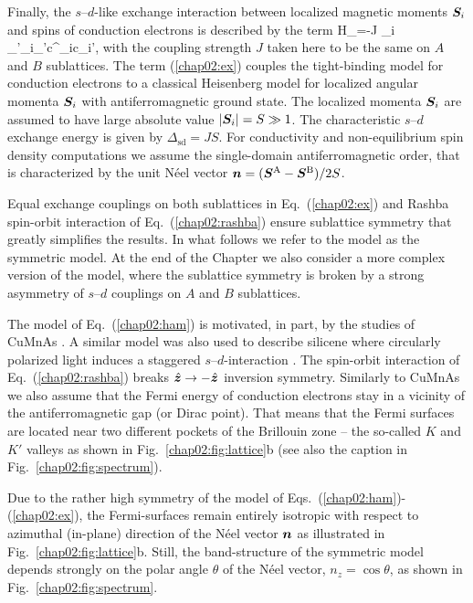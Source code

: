 Finally, the $s$--$d$-like exchange interaction between localized magnetic moments $\boldsymbol{S}_i$ and spins of conduction electrons is described by the term
\be
\label{chap02:ex}
H_=-J \s_{i} \s_{\sigma\sigma'}_i\cdot \bb{\sigma}_{\sigma\sigma'}c^\dagger_{i\sigma}c\0_{i\sigma'},
\e
with the coupling strength $J$ taken here to be the same on $A$ and $B$ sublattices. The term (\ref{chap02:ex}) couples the tight-binding model for conduction electrons to a  classical Heisenberg model for localized angular momenta $\boldsymbol{S}_i$ with antiferromagnetic ground state. The localized momenta $\boldsymbol{S}_i$ are assumed to have large absolute value $|\boldsymbol{S}_i|=S\gg 1$. The characteristic $s$--$d$ exchange energy is given by $\Delta_\text{sd} = J S$.  For conductivity and non-equilibrium spin density computations we assume the single-domain antiferromagnetic order, that is characterized by the unit N\'eel vector $\boldsymbol{n} = (\boldsymbol{S}^\textrm{A}-\boldsymbol{S}^\textrm{B})/2S$. 

Equal exchange couplings on both sublattices in Eq.~(\ref{chap02:ex}) and Rashba spin-orbit interaction of Eq.~(\ref{chap02:rashba}) ensure sublattice symmetry that greatly simplifies the results. In what follows we refer to the model as the symmetric model. At the end of the Chapter we also consider a more complex version of the model, where the sublattice symmetry is broken by a strong asymmetry of $s$--$d$ couplings on $A$ and $B$ sublattices.
 
The model of Eq.~(\ref{chap02:ham}) is motivated, in part, by the studies of CuMnAs \cite{smejkal_electric_2017}. A similar model was also used to describe silicene where circularly polarized light induces a staggered $s$--$d$-interaction \cite{ezawa_photoinduced_2013}. The spin-orbit interaction of Eq.~(\ref{chap02:rashba}) breaks $\hat{\boldsymbol{z}}\to -\hat{\boldsymbol{z}}$ inversion symmetry. Similarly to CuMnAs we also assume that the Fermi energy of conduction electrons stay in a vicinity of the antiferromagnetic gap (or Dirac point). That means that the Fermi surfaces are located near two different pockets of the Brillouin zone -- the so-called $K$ and $K'$ valleys as shown in Fig.~\ref{chap02:fig:lattice}b (see also the caption in Fig.~\ref{chap02:fig:spectrum}). 

Due to the rather high symmetry of the model of Eqs.~(\ref{chap02:ham})-(\ref{chap02:ex}), the Fermi-surfaces remain entirely isotropic with respect to azimuthal (in-plane) direction of the N\'eel vector $\boldsymbol{n}$ as illustrated in Fig.~\ref{chap02:fig:lattice}b. Still, the band-structure of the symmetric model depends strongly on the polar angle $\theta$ of the N\'eel vector, $n_z= \cos\theta$, as shown in Fig.~\ref{chap02:fig:spectrum}.

